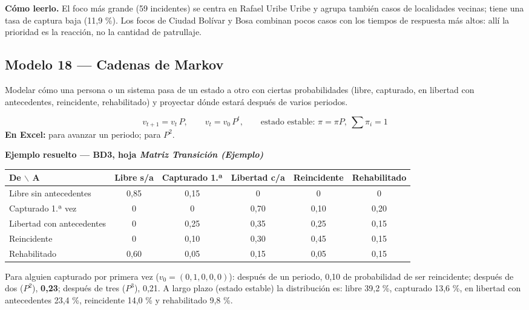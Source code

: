 \textbf{Cómo leerlo.} El foco más grande (59 incidentes) se centra en Rafael Uribe Uribe y
agrupa también casos de localidades vecinas; tiene una tasa de captura baja (11,9 \%).
Los focos de Ciudad Bolívar y Bosa combinan pocos casos con los tiempos de respuesta más
altos: allí la prioridad es la reacción, no la cantidad de patrullaje.

\subsection{Modelo 18 --- Cadenas de Markov}

\begin{cajaModelo}
Modelar cómo una persona o un sistema pasa de un estado a otro con ciertas
probabilidades (libre, capturado, en libertad con antecedentes, reincidente,
rehabilitado) y proyectar dónde estará después de varios periodos.
\end{cajaModelo}

\[
v_{t+1}=v_t\,P,\qquad v_t=v_0\,P^{t},\qquad \text{estado estable: } \pi=\pi P,\ \textstyle\sum\pi_i=1
\]
\textbf{En Excel:}  para avanzar un periodo;  para $P^2$.

\textbf{Ejemplo resuelto --- BD3, hoja \textit{Matriz Transición (Ejemplo)}}

\begin{center}
\footnotesize
\begin{tabular}{@{}lccccc@{}}
\toprule
De $\backslash$ A & Libre s/a & Capturado 1.ª & Libertad c/a & Reincidente & Rehabilitado\\
\midrule
Libre sin antecedentes & 0,85 & 0,15 & 0 & 0 & 0\\
Capturado 1.ª vez & 0 & 0 & 0,70 & 0,10 & 0,20\\
Libertad con antecedentes & 0 & 0,25 & 0,35 & 0,25 & 0,15\\
Reincidente & 0 & 0,10 & 0,30 & 0,45 & 0,15\\
Rehabilitado & 0,60 & 0,05 & 0,15 & 0,05 & 0,15\\
\bottomrule
\end{tabular}
\end{center}

Para alguien capturado por primera vez ($v_0=(0,1,0,0,0)$): después de un periodo, 0,10
de probabilidad de ser reincidente; después de dos ($P^2$), \textbf{0,23}; después de tres
($P^3$), 0,21. A largo plazo (estado estable) la distribución es: libre 39,2 \%, capturado
13,6 \%, en libertad con antecedentes 23,4 \%, reincidente 14,0 \% y rehabilitado 9,8 \%.

